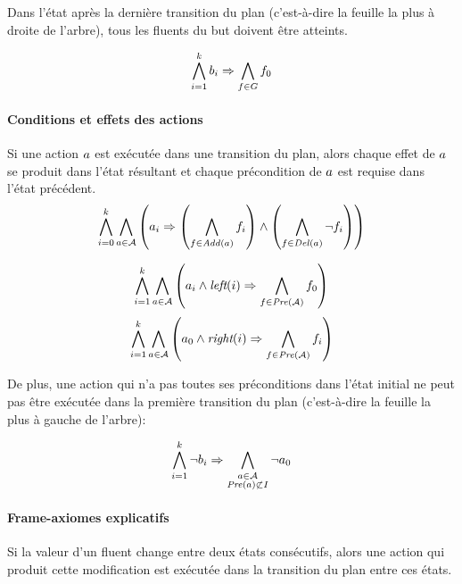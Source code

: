 Dans l'état après la dernière transition du plan (c'est-à-dire la feuille la plus à droite de l'arbre), tous les fluents du but doivent être atteints.

\[ \bigwedge\limits_{\substack{i=1}}^{k} b_{i} \Rightarrow \bigwedge\limits_{\substack{f\in G}} {f}_{0} \]	

\paragraph*{Conditions et effets des actions}

Si une action $a$ est exécutée dans une transition du plan, alors chaque effet de $a$ se produit dans l'état résultant et chaque précondition de $a$ est requise dans l'état précédent.
\[ \bigwedge\limits_{\substack{i=0}}^{k} \bigwedge\limits_{\substack{a \in \mathcal{A}}} \left(a_{i} \Rightarrow \left( \bigwedge\limits_{\substack{f\in \mathit{Add}(a)}} f_{i} \right) \wedge \left( \bigwedge\limits_{\substack{f\in \mathit{Del}(a)}} \neg f_{i} \right) \right) \]

\[ \bigwedge\limits_{\substack{i=1}}^{k} \bigwedge\limits_{\substack{a\in \mathcal{A}}}
\left(a_{i} \wedge \textit{left}(i) \Rightarrow \bigwedge\limits_{\substack{f \in \mathit{Pre}(\mathcal{A})}} f_{0}\right)\]
\[\bigwedge\limits_{\substack{i=1}}^{k} \bigwedge\limits_{\substack{a\in \mathcal{A}}}
\left(a_{0} \wedge \textit{right}(i) \Rightarrow \bigwedge\limits_{\substack{f \in \mathit{Pre}(\mathcal{A})}} f_{i}\right)\]

De plus, une action qui n'a pas toutes ses préconditions dans l'état initial ne peut pas être exécutée dans la première transition du plan (c'est-à-dire la feuille la plus à gauche de l'arbre):

\[ \bigwedge\limits_{\substack{i=1}}^{k}\neg b_{i} \Rightarrow \bigwedge\limits_{\substack{a\in \mathcal{A}\\ \mathit{Pre}(a) \not\subset I}} \neg {a}_{0} \]

\paragraph*{Frame-axiomes explicatifs}

Si la valeur d'un fluent change entre deux états consécutifs, alors une action qui produit cette modification est exécutée dans la transition du plan entre ces états.

